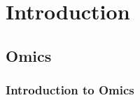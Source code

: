 \chapter{Introduction}
\label{c:intro}








%
%



%


\section{Omics}

\subsection{Introduction to Omics}

